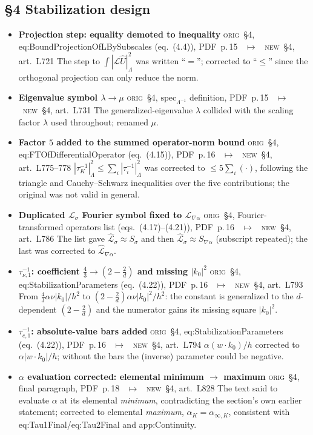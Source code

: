 \documentclass[11pt]{article}
\newcommand{\Orig}{\textcolor{origc}{\footnotesize\textsc{orig}}}
\newcommand{\New}{\textcolor{newc}{\footnotesize\textsc{new}}}
\newcommand{\code}[1]{\textcolor{newc}{\ttfamily\small #1}}
\newcommand{\pdfp}[1]{PDF~p.\,#1}
\newcommand{\artl}[1]{art.\ L#1}       %
\newcommand{\ch}[4]{%
  \item \textbf{#1}\newline
    {\footnotesize\Orig\ #2 \ \textcolor{locc}{$\longmapsto$} \ \New\ #3}\newline
    #4}
\begin{document}
\subsection{\S4 Stabilization design}
\begin{itemize}
\ch{Projection step: equality demoted to inequality}
   {\S4, \code{eq:BoundProjectionOfLBySubscales} (eq.~(4.4)), \pdfp{15}}
   {\S4, \artl{721}}
   {The step to $\int|\mathcal L\widehat U|_\Lambda^2$ was written ``$=$''; corrected to
    ``$\le$'' since the orthogonal projection can only reduce the norm.}
\ch{Eigenvalue symbol $\lambda\to\mu$}
   {\S4, $\mathrm{spec}_{\Lambda^{-1}}$ definition, \pdfp{15}}
   {\S4, \artl{731}}
   {The generalized-eigenvalue $\lambda$ collided with the scaling factor $\lambda$ used throughout;
    renamed $\mu$.}
\ch{Factor $5$ added to the summed operator-norm bound}
   {\S4, \code{eq:FTOfDifferentialOperator} (eq.~(4.15)), \pdfp{16}}
   {\S4, \artl{775}--778}
   {$|\tau_K^{-1}|_\Lambda^2\le\sum_i|\tau_i^{-1}|_\Lambda^2$ was corrected to
    $\le5\sum_i(\cdot)$, following the triangle and Cauchy--Schwarz inequalities over the five
    contributions; the original was not valid in general.}
\ch{Duplicated $\mathcal L_\sigma$ Fourier symbol fixed to $\mathcal L_{\nabla\alpha}$}
   {\S4, Fourier-transformed operators list (eqs.~(4.17)--(4.21)), \pdfp{16}}
   {\S4, \artl{786}}
   {The list gave $\widehat{\mathcal L}_\sigma\approx S_\sigma$ and then
    $\widehat{\mathcal L}_\sigma\approx S_{\nabla\alpha}$ (subscript repeated); the last was corrected
    to $\widehat{\mathcal L}_{\nabla\alpha}$.}
\ch{$\tau_{\nu,1}^{-1}$: coefficient $\tfrac43\to(2-\tfrac2d)$ and missing $|k_0|^2$}
   {\S4, \code{eq:StabilizationParameters} (eq.~(4.22)), \pdfp{16}}
   {\S4, \artl{793}}
   {From $\tfrac43\alpha\nu|k_0|/h^2$ to $(2-\tfrac2d)\alpha\nu|k_0|^2/h^2$: the constant is
    generalized to the $d$-dependent $(2-\tfrac2d)$ and the numerator gains its missing square
    $|k_0|^2$.}
\ch{$\tau_{c,1}^{-1}$: absolute-value bars added}
   {\S4, \code{eq:StabilizationParameters} (eq.~(4.22)), \pdfp{16}}
   {\S4, \artl{794}}
   {$\alpha(w\!\cdot\!k_0)/h$ corrected to $\alpha|w\!\cdot\!k_0|/h$; without the bars the (inverse)
    parameter could be negative.}
\ch{$\alpha$ evaluation corrected: elemental minimum $\to$ maximum}
   {\S4, final paragraph, \pdfp{18}}
   {\S4, \artl{828}}
   {The text said to evaluate $\alpha$ at its elemental \emph{minimum}, contradicting the section's own
    earlier statement; corrected to elemental \emph{maximum}, $\alpha_K=\alpha_{\infty,K}$, consistent
    with \code{eq:Tau1Final}/\code{eq:Tau2Final} and \code{app:Continuity}.}
\end{itemize}
\end{document}
